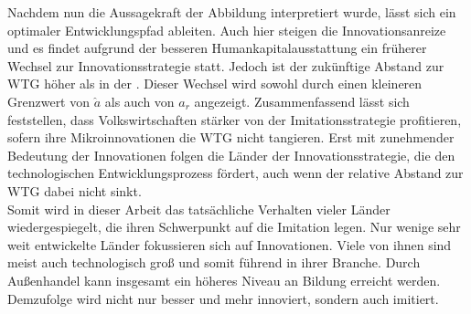 Nachdem nun die Aussagekraft der Abbildung interpretiert wurde, lässt sich ein optimaler Entwicklungspfad ableiten. Auch hier steigen die Innovationsanreize und es findet aufgrund der besseren Humankapitalausstattung ein früherer Wechsel zur \textcolor[rgb]{0.74,0.97,0.22}{Innovationsstrategie} statt. Jedoch ist der zukünftige Abstand zur WTG höher als in der . Dieser Wechsel wird sowohl durch einen kleineren Grenzwert von $\hat{a}$ als auch von $a_r$ angezeigt.
\bigskip
%
Zusammenfassend lässt sich feststellen, dass Volkswirtschaften stärker von der Imitationsstrategie profitieren, sofern ihre Mikroinnovationen die WTG nicht tangieren. Erst mit zunehmender Bedeutung der Innovationen folgen die Länder der Innovationsstrategie, die den technologischen Entwicklungsprozess fördert, auch wenn der relative Abstand zur WTG dabei nicht sinkt. \\
Somit wird in dieser Arbeit das tatsächliche Verhalten vieler Länder wiedergespiegelt, die ihren Schwerpunkt auf die Imitation legen. Nur wenige sehr weit entwickelte Länder fokussieren sich auf Innovationen. Viele von ihnen sind meist auch technologisch groß und somit führend in ihrer Branche. Durch Außenhandel kann insgesamt ein höheres Niveau an Bildung erreicht werden. Demzufolge wird nicht nur besser und mehr innoviert, sondern auch imitiert.

